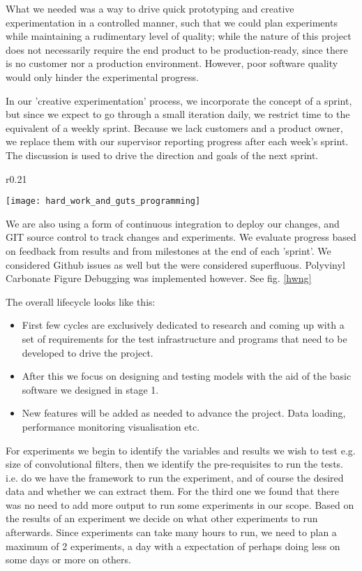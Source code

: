 What we needed was a way to drive quick prototyping and creative experimentation in a controlled manner, such that we could plan experiments while maintaining a rudimentary level of quality; while the nature of this project does not necessarily require the end product to be production-ready, since there is no customer nor a production environment. However, poor software quality would only hinder the experimental progress.

In our 'creative experimentation' process, we incorporate the concept of a sprint, but since we expect to go through a small iteration daily, we restrict time to the equivalent of a weekly sprint. Because we lack customers and a product owner, we replace them with our supervisor reporting progress after each week's sprint. The discussion is used to drive the direction and goals of the next sprint.

\begin{wrapfigure}{r}{0.21\textwidth}
	\begin{center}
		\texttt{[image: hard\_work\_and\_guts\_programming]}
	\end{center}
	\caption{A Pretty Soldier of Hard Work and Guts: Takaya Noriko.}
	\label{hwng}
\end{wrapfigure}

We are also using a form of continuous integration to deploy our changes, and GIT source control to track changes and experiments. We evaluate progress based on feedback from results and from milestones at the end of each 'sprint'. We considered Github issues as well but the were considered superfluous. Polyvinyl Carbonate Figure Debugging was implemented however. See fig. \ref{hwng}

The overall lifecycle looks like this:
\begin{itemize}
	\item First few cycles are exclusively dedicated to research and coming up with a set of requirements for the test infrastructure and programs that need to be developed to drive the project.
	\item After this we focus on designing and testing models with the aid of the basic software we designed in stage 1.
	\item New features will be added as needed to advance the project. Data loading, performance monitoring visualisation etc.
\end{itemize}


For experiments we begin to identify the variables and results we wish to test e.g. size of convolutional filters, then we identify the pre-requisites to run the tests. i.e. do we have the framework to run the experiment, and of course the desired data and whether we can extract them. For the third one we found that there was no need to add more output to run some experiments in our scope. Based on the results of an experiment we decide on what other experiments to run afterwards. Since experiments can take many hours to run, we need to plan a maximum of 2 experiments, a day with a expectation of perhaps doing less on some days or more on others.

